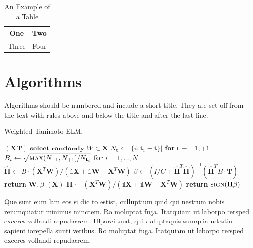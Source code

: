 \documentclass[journal]{IEEEtran}
\begin{document}
\begin{table}[!t]
\caption{An Example of a Table\label{tab:table1}}
\centering
\begin{tabular}{|c||c|}
\hline
One & Two\\
\hline
Three & Four\\
\hline
\end{tabular}
\end{table}

\section{Algorithms}
Algorithms should be numbered and include a short title. They are set off from the text with rules above and below the title and after the last line.

\begin{algorithm}[H]
\caption{Weighted Tanimoto ELM.}\label{alg:alg1}
\begin{algorithmic}
\STATE 
{}$(\mathbf{X} \mathbf{T})$
\STATE \hspace{0.5cm}$ \textbf{select randomly } W \subset \mathbf{X}  $
\STATE \hspace{0.5cm}$ N_\mathbf{t} \gets | \{ i : \mathbf{t}_i = \mathbf{t} \} | $ \textbf{ for } $ \mathbf{t}= -1,+1 $
\STATE \hspace{0.5cm}$ B_i \gets \sqrt{ \textsc{max}(N_{-1},N_{+1}) / N_{\mathbf{t}_i} } $ \textbf{ for } $ i = 1,...,N $
\STATE \hspace{0.5cm}$ \hat{\mathbf{H}} \gets  B \cdot (\mathbf{X}^T\textbf{W})/( \mathbb{1}\mathbf{X} + \mathbb{1}\textbf{W} - \mathbf{X}^T\textbf{W} ) $
\STATE \hspace{0.5cm}$ \beta \gets \left ( I/C + \hat{\mathbf{H}}^T\hat{\mathbf{H}} \right )^{-1}(\hat{\mathbf{H}}^T B\cdot \mathbf{T})  $
\STATE \hspace{0.5cm}\textbf{return}  $\textbf{W},  \beta $
\STATE 
{}$(\mathbf{X} )$
\STATE \hspace{0.5cm}$ \mathbf{H} \gets  (\mathbf{X}^T\textbf{W} )/( \mathbb{1}\mathbf{X}  + \mathbb{1}\textbf{W}- \mathbf{X}^T\textbf{W}  ) $
\STATE \hspace{0.5cm}\textbf{return}  $\textsc{sign}( \mathbf{H} \beta )$
\end{algorithmic}
\label{alg1}
\end{algorithm}

Que sunt eum lam eos si dic to estist, culluptium quid qui nestrum nobis reiumquiatur minimus minctem. Ro moluptat fuga. Itatquiam ut laborpo rersped exceres vollandi repudaerem. Ulparci sunt, qui doluptaquis sumquia ndestiu sapient iorepella sunti veribus. Ro moluptat fuga. Itatquiam ut laborpo rersped exceres vollandi repudaerem. 
\end{document}
